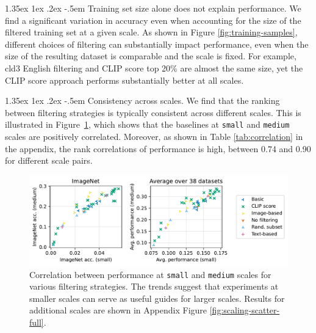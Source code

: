 \documentclass[dvipsnames,11pt]{article}
\makeatletter
\renewcommand\paragraph{\@startsection{paragraph}{4}{\z@}                                     {1.35ex \@plus1ex \@minus.2ex}                                {-.5em}
{\normalfont\normalsize\bfseries}}
\makeatother
\begin{document}
\paragraph{Training set size alone does not explain performance.}
We find a significant variation in accuracy even when accounting for the size of the filtered training set at a given scale. As shown in Figure \ref{fig:training-samples}, different choices of filtering can substantially impact performance, even when the size of the resulting dataset is comparable and the scale is fixed. For example, cld3 English filtering and CLIP score top 20\% are almost the same size, yet the CLIP score approach performs substantially better at all scales.



\paragraph{Consistency across scales.} We find that the ranking between filtering strategies is typically consistent across different scales. This is illustrated in Figure~\ref{fig:scaling-scatter}, which shows that the baselines at {\small \texttt{small}} and {\small \texttt{medium}} scales are positively correlated. Moreover, as shown in Table \ref{tab:correlation} in the appendix, the rank correlations of performance is high, between 0.74 and 0.90 for different scale pairs.

\begin{figure}
    \centering
    \includegraphics[width=\linewidth]{figures/scaling_scatter_mini.pdf}
    \caption{Correlation between performance at {\small \texttt{small}} and {\small \texttt{medium}} scales for various filtering strategies. The trends suggest that experiments at smaller scales can serve as useful guides for larger scales. Results for additional scales are shown in Appendix Figure \ref{fig:scaling-scatter-full}.
    }
    \label{fig:scaling-scatter}
\end{figure}
\end{document}
